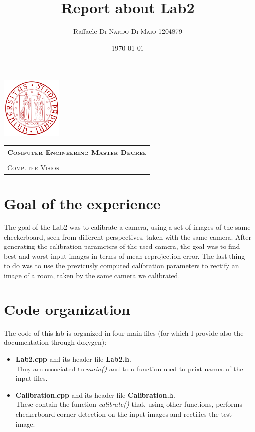 \documentclass{article}
\title{\textbf{Report about Lab2}} %
\author{Raffaele \textsc{Di Nardo Di Maio} 1204879} %
\date{\today}
\begin{document}
\begin{minipage}{.20\textwidth}
  \includegraphics[height=3cm]{../Icon4}
\end{minipage}\begin{minipage}{.20\textwidth}
  \begin{table}[H]
  \begin{tabular}{l}
  \scshape{\Large{Computer Engineering Master Degree}} \\
  \hline \\
  \scshape{\Large{Computer Vision}} \\
  \end{tabular}
  \end{table}
\end{minipage}
{\let\newpage\relax\maketitle}
\section{Goal of the experience}
The goal of the Lab2 was to calibrate a camera, using a set of images of the same checkerboard, seen from different perspectives, taken with the same camera. After generating the calibration parameters of the used camera, the goal was to find best and worst input images in terms of mean reprojection error. The last thing to do was to use the previously computed calibration parameters to rectify an image of a room, taken by the same camera we calibrated.
\section{Code organization}
The code of this lab is organized in four main files (for which I provide also the documentation through doxygen):
\begin{itemize}
\item{\textbf{Lab2.cpp} and its header file \textbf{Lab2.h}.\\
They are associated to \textit{main()} and to a function used to print names of the input files.}
\item{\textbf{Calibration.cpp} and its header file \textbf{Calibration.h}.\\
These contain the function \textit{calibrate()} that, using other functions, performs checkerboard corner detection on the input images and rectifies the test image.}
\end{itemize}
\end{document}
